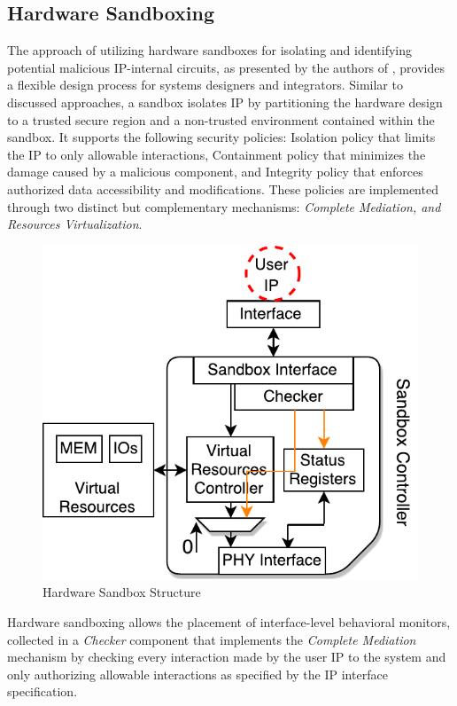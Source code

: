 \documentclass[sigconf]{acmart}
\theoremstyle{plain}
\theoremstyle{remark}
\begin{document}
\subsection{Hardware Sandboxing}\label{sec:HardwareSandbox}
The approach of utilizing hardware sandboxes for isolating and identifying potential malicious IP-internal circuits, as presented by the authors of \cite{CAPSL}, provides a flexible design process for systems designers and integrators. Similar to discussed approaches, a sandbox isolates IP by partitioning the hardware design to a trusted secure region and a non-trusted environment contained within the sandbox. It supports the following security policies: Isolation policy that limits the IP to only allowable interactions, Containment policy that minimizes the damage caused by a malicious component, and Integrity policy that enforces authorized data accessibility and modifications. These policies are implemented through two distinct but complementary mechanisms: \textit{ Complete Mediation, and  Resources Virtualization}.

\begin{figure}[hbt]
\centering
\includegraphics[width=0.75\columnwidth]{figures/sandbox.pdf}
\caption{Hardware Sandbox Structure} %
\label{fig:sandbox}
\end{figure}

Hardware sandboxing allows the placement of interface-level behavioral monitors, collected in a \textit{Checker} component that implements the \textit{Complete Mediation} mechanism by checking every interaction made by the user IP to the system and only authorizing allowable interactions as specified by the IP interface specification.
\end{document}
